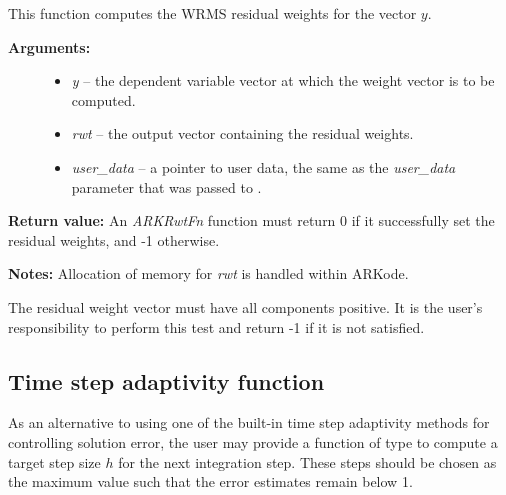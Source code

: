 \documentclass[letterpaper,10pt,english]{sphinxmanual}
\begin{document}
\begin{fulllineitems}
\label{c_interface/User_supplied:c.ARKRwtFn}
This function computes the WRMS residual weights for the vector
\(y\).
\begin{description}
\item[{\textbf{Arguments:}}] \leavevmode\begin{itemize}
\item {} 
\emph{y} -- the dependent variable vector at which the
weight vector is to be computed.

\item {} 
\emph{rwt} -- the output vector containing the residual weights.

\item {} 
\emph{user\_data} -- a pointer to user data, the same as the
\emph{user\_data} parameter that was passed to {\hyperref[c_interface/User_callable:c.ARKodeSetUserData]{\emph{}}}.

\end{itemize}

\end{description}

\textbf{Return value:}
An \emph{ARKRwtFn} function must return 0 if it
successfully set the residual weights, and -1 otherwise.

\textbf{Notes:} Allocation of memory for \emph{rwt} is handled within ARKode.

The residual weight vector must have all components positive.  It is
the user's responsibility to perform this test and return -1 if it
is not satisfied.

\end{fulllineitems}



\subsection{Time step adaptivity function}
\label{c_interface/User_supplied:time-step-adaptivity-function}\label{c_interface/User_supplied:cinterface-adaptivityfn}
As an alternative to using one of the built-in time step adaptivity
methods for controlling solution error, the user may provide a
function of type {\hyperref[c_interface/User_supplied:c.ARKAdaptFn]{\emph{}}} to compute a target step size
\(h\) for the next integration step.  These steps should be chosen
as the maximum value such that the error estimates remain below 1.
\end{document}
